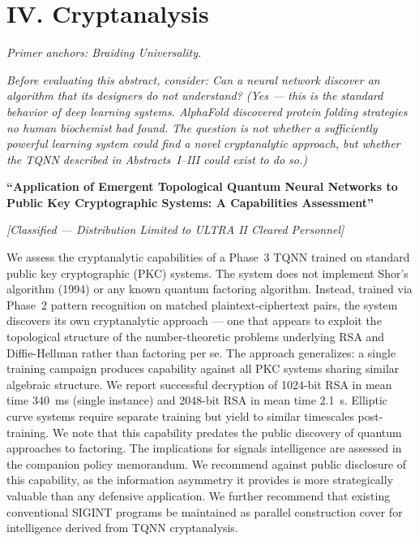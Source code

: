 \vspace{1cm}

\section*{IV. Cryptanalysis}
\label{appendix:cryptanalysis}

\noindent\textit{Primer anchors: Braiding Universality.}

\noindent\textit{Before evaluating this abstract, consider: Can a neural network discover an algorithm that its designers do not understand? (Yes --- this is the standard behavior of deep learning systems. AlphaFold discovered protein folding strategies no human biochemist had found. The question is not whether a sufficiently powerful learning system could find a novel cryptanalytic approach, but whether the TQNN described in Abstracts~I--III could exist to do so.)}

\vspace{0.3cm}

\textbf{``Application of Emergent Topological Quantum Neural Networks to Public Key Cryptographic Systems: A Capabilities Assessment''}

\textit{[Classified --- Distribution Limited to ULTRA II Cleared Personnel]}

\vspace{0.3cm}

We assess the cryptanalytic capabilities of a Phase~3 TQNN trained on standard public key cryptographic (PKC) systems. The system does not implement Shor's algorithm (1994) or any known quantum factoring algorithm. Instead, trained via Phase~2 pattern recognition on matched plaintext-ciphertext pairs, the system discovers its own cryptanalytic approach --- one that appears to exploit the topological structure of the number-theoretic problems underlying RSA and Diffie-Hellman rather than factoring per se. The approach generalizes: a single training campaign produces capability against all PKC systems sharing similar algebraic structure. We report successful decryption of 1024-bit RSA in mean time 340~ms (single instance) and 2048-bit RSA in mean time 2.1~s. Elliptic curve systems require separate training but yield to similar timescales post-training. We note that this capability predates the public discovery of quantum approaches to factoring. The implications for signals intelligence are assessed in the companion policy memorandum. We recommend against public disclosure of this capability, as the information asymmetry it provides is more strategically valuable than any defensive application. We further recommend that existing conventional SIGINT programs be maintained as parallel construction cover for intelligence derived from TQNN cryptanalysis.

